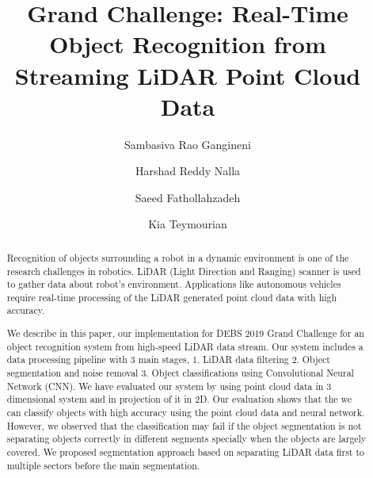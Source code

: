 \documentclass[sigconf]{acmart}
\begin{document}
%

\title{Grand Challenge: Real-Time Object Recognition from Streaming LiDAR Point Cloud Data}


%


\author{Sambasiva Rao Gangineni}

\author{Harshad Reddy Nalla}


\author{Saeed Fathollahzadeh}

\author{Kia Teymourian}



%
\renewcommand{\shortauthors}{Gangineni, et al.}

%
\begin{abstract}
Recognition of objects surrounding a robot in a dynamic environment is one of the research challenges in robotics.
LiDAR (Light Direction and Ranging) scanner is used to gather data about robot's environment.  
Applications like autonomous vehicles require real-time processing of the LiDAR generated point cloud data with high accuracy.   

We describe in this paper, our implementation for DEBS 2019 Grand Challenge for an object recognition system from high-speed 
LiDAR data stream. Our system includes a data processing pipeline with 3 main stages, 1. LiDAR data filtering 2. Object segmentation and noise removal 3. Object classifications using Convolutional Neural Network (CNN). We have evaluated our system by using point cloud data in 3 dimensional system and in projection of it in 2D. Our evaluation shows that the we can classify objects with high accuracy using the point cloud data and neural network. However, we observed that the classification may fail if the object segmentation is not separating objects correctly in different segments specially when the objects are largely covered. We proposed segmentation approach based on separating LiDAR data first to multiple sectors before the main segmentation.     
\end{abstract}
\end{document}
